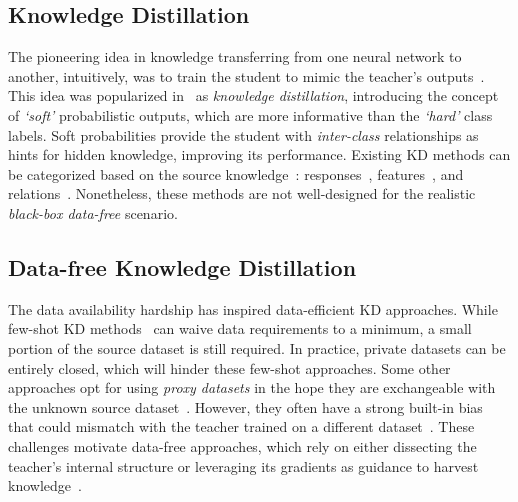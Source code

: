 \subsection{Knowledge Distillation} \label{ssec:02-related-kd}
\begin{foldable} %
    The pioneering idea in knowledge transferring from one neural network to another, intuitively, was to train the student to mimic the teacher's outputs~\cite{bucila2006model}.
    This idea was popularized in~\cite{hinton2015distilling} as \textit{knowledge distillation}, introducing the concept of \textit{`soft'} probabilistic outputs, which are more informative than the \textit{`hard'} class labels.
    Soft probabilities provide the student with \textit{inter-class} relationships as hints for hidden knowledge, improving its performance.
    Existing KD methods can be categorized based on the source knowledge~\cite{gou2021knowledge}: responses~\cite{ba2014deep, hinton2015distilling, nguyen2021knowledge, li2023curriculum}, features~\cite{romero2015fitnets, zagoruyko2016paying, passalis2018learning, liu2019knowledge}, and relations~\cite{yim2017gift, park2019relational, chen2020learning}.
    Nonetheless, these methods are not well-designed for the realistic \textit{black-box data-free} scenario.
\end{foldable}

\subsection{Data-free Knowledge Distillation} \label{ssec:02-related-dfkd}
\begin{foldable} %
    The data availability hardship has inspired data-efficient KD approaches.
    While few-shot KD methods~\cite{wang2020neural, nguyen2022black, vo2024improving} can waive data requirements to a minimum, a small portion of the source dataset is still required.
    In practice, private datasets can be entirely closed, which will hinder these few-shot approaches.
    Some other approaches opt for using \textit{proxy datasets} in the hope they are exchangeable with the unknown source dataset~\cite{chen2021learning, tang2023distribution}.
    However, they often have a strong built-in bias that could mismatch with the teacher trained on a different dataset~\cite{torralba2011unbiased}.
    These challenges motivate data-free approaches, which rely on either dissecting the teacher's internal structure or leveraging its gradients as guidance to harvest knowledge~\cite{chen2019data, fang2019datafree, fang2021contrastive, do2022momentum, tran2024nayer}.
\end{foldable}

